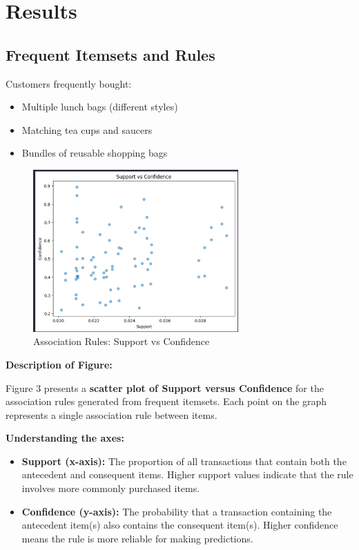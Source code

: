\documentclass[12pt]{article}
\begin{document}
\section{Results}

\subsection{Frequent Itemsets and Rules}

Customers frequently bought:
\begin{itemize}
    \item Multiple lunch bags (different styles)
    \item Matching tea cups and saucers
    \item Bundles of reusable shopping bags
\end{itemize}

\begin{figure}[H]
    \centering
    \includegraphics[width=0.7\textwidth]{images/support_vs_confidence.png}
    \caption{Association Rules: Support vs Confidence}
\end{figure}

\noindent
\textbf{Description of Figure:} \\

\vspace{0.2cm}

Figure 3 presents a \textbf{scatter plot of Support versus Confidence} for the association rules generated from frequent itemsets.  
Each point on the graph represents a single association rule between items.

\vspace{0.4cm}

\textbf{Understanding the axes:}
\begin{itemize}
    \item \textbf{Support (x-axis):}  
    The proportion of all transactions that contain both the antecedent and consequent items.  
    Higher support values indicate that the rule involves more commonly purchased items.
    
    \item \textbf{Confidence (y-axis):}  
    The probability that a transaction containing the antecedent item(s) also contains the consequent item(s).  
    Higher confidence means the rule is more reliable for making predictions.
\end{itemize}
\end{document}
